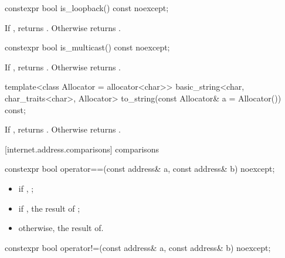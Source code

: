 \begin{itemdecl}
constexpr bool is_loopback() const noexcept;
\end{itemdecl}

\begin{itemdescr}
\pnum
\returns If , returns . Otherwise returns .
\end{itemdescr}

\begin{itemdecl}
constexpr bool is_multicast() const noexcept;
\end{itemdecl}

\begin{itemdescr}
\pnum
\returns If , returns . Otherwise returns .
\end{itemdescr}

\begin{itemdecl}
template<class Allocator = allocator<char>>
  basic_string<char, char_traits<char>, Allocator>
    to_string(const Allocator& a = Allocator()) const;
\end{itemdecl}

\begin{itemdescr}
\pnum
\returns If , returns . Otherwise returns .
\end{itemdescr}



[internet.address.comparisons]{ comparisons}

\begin{itemdecl}
constexpr bool operator==(const address& a, const address& b) noexcept;
\end{itemdecl}

\begin{itemdescr}
\pnum
\returns 
\begin{itemize}
\item
 if , ;
\item
 if , the result of ;
\item
 otherwise, the result of.
\end{itemize}
\end{itemdescr}

\begin{itemdecl}
constexpr bool operator!=(const address& a, const address& b) noexcept;
\end{itemdecl}

